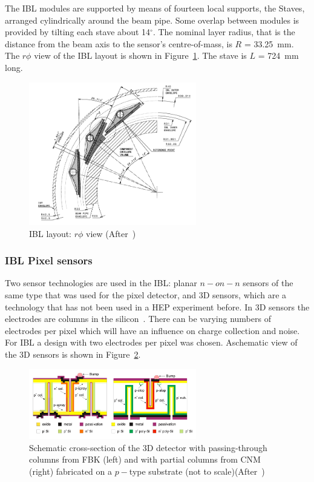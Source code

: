 The IBL modules are supported by means of fourteen local supports, the Staves, arranged cylindrically
around the beam pipe. Some overlap between modules is provided by tilting each stave
about 14$^{\circ}$. The nominal layer radius, that is the distance from the beam axis to the sensor's
centre-of-mass, is $R$ = 33.25~mm. The $r\phi$ view of the IBL layout is shown in Figure~\ref{fig:IBLrphi}. The stave is $L$ = 724~mm long. 

\begin{figure}[!htpb]
\centering
\includegraphics[width=0.65\textwidth]{IBLrphi.png}
\caption{\label{fig:IBLrphi}IBL layout: $r\phi$ view (After~\cite{IBLTDR})}
\end{figure}

\subsubsection{IBL Pixel sensors}
Two sensor technologies are used in the IBL: planar $n-on-n$ sensors of the same type
that was used for the pixel detector, and 3D sensors, which are a 
technology that has not
been used in a HEP experiment before. In 3D sensors the electrodes are columns in
the silicon~\cite{PARKER1997328}. There can be varying numbers of electrodes per pixel which will 
have an influence on charge collection and noise. For IBL a design with two electrodes per pixel was chosen. Aschematic view of the 3D sensors is shown in Figure~\ref{fig:tredi}.
\begin{figure}[!htpb]
\centering
\includegraphics[width=0.65\textwidth]{tredi.png}
\caption{\label{fig:tredi} Schematic cross-section of the 3D detector with passing-through columns from FBK (left) and
with partial columns from CNM (right) fabricated on a $p-$type substrate (not to scale)(After~\cite{Darbo:2014kma})}
\end{figure}

